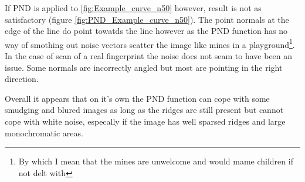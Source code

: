 \documentclass[11pt,a4paper]{article}
\begin{document}
\begin{multicols}{2}
		If PND is applied to \ref{fig:Example_curve_n50} however, result is not as satisfactory (figure \ref{fig:PND_Example_curve_n50}). The point normals at the edge of the line do point towatds the line however as the PND function has no way of smothing out noise vectors scatter the image like mines in a playground\footnote{By which I mean that the mines are unwelcome and would mame children if not delt with}. In the case of scan of a real fingerprint the noise does not seam to have been an issue. Some normals are incorrectly angled but most are pointing in the right direction.

		Overall it appears that on it's own the PND function can cope with some smudging and blured images as long as the ridges are still present but cannot cope with white noise, especally if the image has well sparsed ridges and large monochromatic areas.


\end{multicols}
\end{document}
